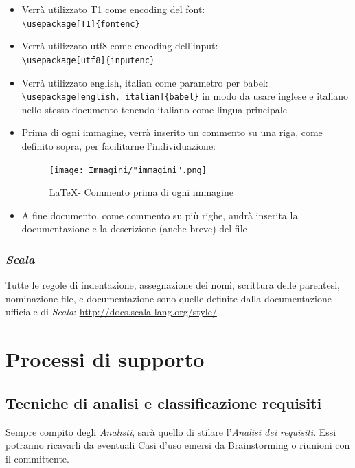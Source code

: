 \documentclass[a4paper]{article}
\begin{document}
\begin{itemize}
			\item Verrà utilizzato T1 come encoding del font: \\ \verb|\usepackage[T1]{fontenc}|
			\item Verrà utilizzato utf8 come encoding dell'input: \\ \verb|\usepackage[utf8]{inputenc}|
			\item Verrà utilizzato english, italian come parametro per babel: \\
			\verb|\usepackage[english, italian]{babel}| in modo da usare inglese e italiano nello
			stesso documento tenendo italiano come lingua principale
			\item Prima di ogni immagine, verrà inserito un commento su una riga, come definito
			sopra, per facilitarne l'individuazione:
			\begin{figure}[H]
				\centering
				\texttt{[image: Immagini/"immagini".png]}
				\caption{\LaTeX \space - Commento prima di ogni immagine}
			\end{figure}
			\item A fine documento, come commento su più righe, andrà inserita la documentazione e la descrizione (anche breve) del file
		\end{itemize}
		
		\subsubsection{\emph{Scala}}
		Tutte le regole di indentazione, assegnazione dei nomi, scrittura delle parentesi, nominazione file, e documentazione sono quelle
		definite dalla documentazione ufficiale di \emph{Scala}: \url{http://docs.scala-lang.org/style/}

	\newpage
	\section{Processi di supporto}
	
		\subsection{Tecniche di analisi e classificazione requisiti}
			Sempre compito degli \emph{Analisti}, sarà quello di stilare l'\emph{Analisi dei requisiti}. Essi potranno ricavarli
			da eventuali Casi d'uso emersi da Brainstorming o riunioni con il committente.
	
\end{document}
